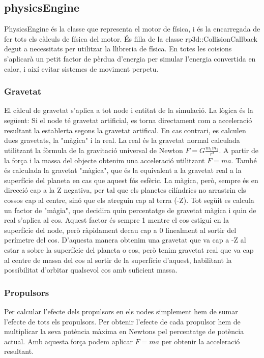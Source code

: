 \subsection{physicsEngine}
PhysicsEngine és la classe que representa el motor de física, i és la encarregada de fer tots els càlculs de física del motor. És filla de la classe rp3d::CollisionCallback degut a necessitats per utilitzar la llibreria de física. 
En totes les co\lgem isions s'aplicarà un petit factor de pèrdua d'energia per simular l'energia convertida en calor, i així evitar sistemes de moviment perpetu.
\subsubsection{Gravetat}
El càlcul de gravetat s'aplica a tot node i entitat de la simulació.
La lògica és la següent:
Si el node té gravetat artificial, es torna directament com a acceleració resultant la establerta segons la gravetat artifical.
En cas contrari, es calculen dues gravetats, la "màgica" i la real. La real és la gravetat normal calculada utilitzant la fòrmula de la gravitació universal de Newton $F=G\frac{m_{1}m_{2}}{r²}$. A partir de la força i la massa del objecte obtenim una acceleració utilitzant $F=ma$.
També és calculada la gravetat "màgica", que és la equivalent a la gravetat real a la superfície del planeta en cas que aquest fós esfèric. La màgica, però, sempre és en direcció cap a la Z negativa, per tal que els planetes cilíndrics no arrastrin els cossos cap al centre, sinó que els atreguin cap al terra (-Z).
Tot següit es calcula un factor de "màgia", que decidira quin percentatge de gravetat màgica i quin de real s'aplica al cos.
Aquest factor és sempre 1 mentre el cos estigui en la superfície del node, però ràpidament decau cap a 0 linealment al sortir del perímetre del cos. D'aquesta manera obtenim una gravetat que va cap a -Z al estar a sobre la superfície del planeta o cos, però tenim gravetat real que va cap al centre de massa del cos al sortir de la superfície d'aquest, habilitant la possibilitat d'orbitar qualsevol cos amb suficient massa.
\subsubsection{Propulsors}
Per calcular l'efecte dels propulsors en els nodes simplement hem de sumar l'efecte de tots els propulsors. Per obtenir l'efecte de cada propulsor hem de multiplicar la seva potència màxima en Newtons pel percentatge de potència actual. Amb aquesta força podem aplicar $F=ma$ per obtenir la acceleració resultant.
